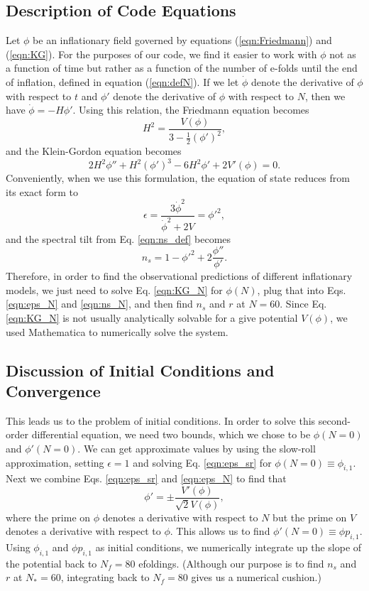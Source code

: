 \documentclass[a4paper,11pt]{article}
\def\half{\tfrac{1}{2}}
\begin{document}
\subsection{Description of Code Equations}
Let $\phi$ be an inflationary field governed by equations (\ref{eqn:Friedmann}) and (\ref{eqn:KG}). For the purposes of our code, we find it easier to work with $\phi$ not as a function of time but rather as a function of the number of e-folds until the end of inflation, defined in equation (\ref{eqn:defN}). If we let $\dot \phi$ denote the derivative of $\phi$ with respect to $t$ and $\phi'$ denote the derivative of $\phi$ with respect to $N$, then we have $\dot \phi = -H \phi'$. Using this relation, the Friedmann equation becomes
\begin{equation}
H^2 = \frac{V(\phi)}{3 - \half(\phi')^2},
\end{equation}
and the Klein-Gordon equation becomes 
\begin{equation}
2H^2\phi'' + H^2(\phi')^3 - 6H^2\phi' + 2V'(\phi) = 0.
\label{eqn:KG_N}
\end{equation}
Conveniently, when we use this formulation, the equation of state reduces from its exact form to
\begin{equation}
\epsilon = \frac{3 \dot \phi^2}{\dot \phi^2 + 2 V} = \phi'^{2},
\label{eqn:eps_N}
\end{equation}
and the spectral tilt from Eq. \ref{eqn:ns_def} becomes
\begin{equation}
n_s = 1 - \phi'^2 + 2\frac{\phi''}{\phi'}.
\label{eqn:ns_N}
\end{equation}
Therefore, in order to find the observational predictions of different inflationary models, we just need to solve Eq. \ref{eqn:KG_N} for $\phi(N)$, plug that into Eqs. \ref{eqn:eps_N} and \ref{eqn:ns_N}, and then find $n_s$ and $r$ at $N=60$. Since Eq. \ref{eqn:KG_N} is not usually analytically solvable for a give potential $V(\phi)$, we used Mathematica to numerically solve the system. 

\subsection{Discussion of Initial Conditions and Convergence}

This leads us to the problem of initial conditions. In order to solve this second-order differential equation, we need two bounds, which we chose to be $\phi(N=0)$ and $\phi'(N=0)$. We can get approximate values by using the slow-roll approximation, setting $\epsilon=1$ and solving Eq. \ref{eqn:eps_sr} for $\phi(N=0)\equiv \phi_{i,1}$. Next we combine Eqs. \ref{eqn:eps_sr} and \ref{eqn:eps_N} to find that 
\begin{equation}
\phi' = \pm \frac{V'(\phi)}{\sqrt{2}V(\phi)},
\end{equation}
where the prime on $\phi$ denotes a derivative with respect to $N$ but the prime on $V$ denotes a derivative with respect to $\phi$. This allows us to find $\phi'(N=0)\equiv \phi p_{i,1}$. Using $\phi_{i,1}$ and $\phi p_{i,1}$ as initial conditions, we numerically integrate up the slope of the potential back to $N_f=80$ efoldings. (Although our purpose is to find $n_s$ and $r$ at $N_*=60$, integrating back to $N_f=80$ gives us a numerical cushion.) 
\end{document}
